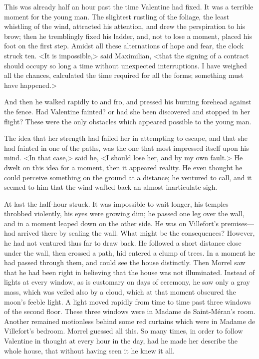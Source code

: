  This was already half an hour past the time Valentine had fixed. It was a terrible moment for the young man. The slightest rustling of the foliage, the least whistling of the wind, attracted his attention, and drew the perspiration to his brow; then he tremblingly fixed his ladder, and, not to lose a moment, placed his foot on the first step. Amidst all these alternations of hope and fear, the clock struck ten. <It is impossible,> said Maximilian, <that the signing of a contract should occupy so long a time without unexpected interruptions. I have weighed all the chances, calculated the time required for all the forms; something must have happened.> 

 And then he walked rapidly to and fro, and pressed his burning forehead against the fence. Had Valentine fainted? or had she been discovered and stopped in her flight? These were the only obstacles which appeared possible to the young man. 

 The idea that her strength had failed her in attempting to escape, and that she had fainted in one of the paths, was the one that most impressed itself upon his mind. <In that case,> said he, <I should lose her, and by my own fault.> He dwelt on this idea for a moment, then it appeared reality. He even thought he could perceive something on the ground at a distance; he ventured to call, and it seemed to him that the wind wafted back an almost inarticulate sigh. 

 At last the half-hour struck. It was impossible to wait longer, his temples throbbed violently, his eyes were growing dim; he passed one leg over the wall, and in a moment leaped down on the other side. He was on Villefort's premises—had arrived there by scaling the wall. What might be the consequences? However, he had not ventured thus far to draw back. He followed a short distance close under the wall, then crossed a path, hid entered a clump of trees. In a moment he had passed through them, and could see the house distinctly.  Then Morrel saw that he had been right in believing that the house was not illuminated. Instead of lights at every window, as is customary on days of ceremony, he saw only a gray mass, which was veiled also by a cloud, which at that moment obscured the moon's feeble light. A light moved rapidly from time to time past three windows of the second floor. These three windows were in Madame de Saint-Méran's room. Another remained motionless behind some red curtains which were in Madame de Villefort's bedroom. Morrel guessed all this. So many times, in order to follow Valentine in thought at every hour in the day, had he made her describe the whole house, that without having seen it he knew it all. 

